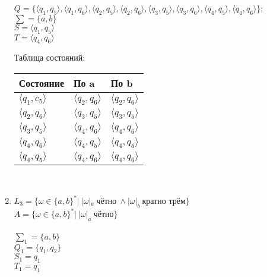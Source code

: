 \documentclass{article}
\begin{document}
\begin{enumerate}
            \hspace*{-20mm}\(Q = \{\langle q_1,q_5\rangle, \langle q_1,q_6\rangle, \langle q_2,q_5\rangle, \langle q_2,q_6\rangle, \langle q_3,q_5\rangle, \langle q_3,q_6\rangle, \langle q_4,q_5\rangle, \langle q_4,q_6\rangle\};\)\\
            \hspace*{-20mm}\(\sum = \{ a,b \}\) \\
            \hspace*{-20mm}\(S = \langle q_1,q_5\rangle\) \\
            \hspace*{-20mm}\(T = \langle q_4,q_6\rangle\) \\

            \centerline{Таблица состояний:}
            
            \begin{tabular}{ | l | l | l | }
            \hline
            Состояние & По a & По b \\ \hline
            \(\langle q_1, c_5\rangle\) & \(\langle q_2, q_6\rangle\) & \(\langle q_2, q_6\rangle\)  \\ \hline
            \(\langle q_2, q_6\rangle\) & \(\langle q_3, q_5\rangle\) & \(\langle q_3, q_5\rangle\) \\ \hline
            \(\langle q_3, q_5\rangle\) & \(\langle q_4, q_6\rangle\) & \(\langle q_4, q_6\rangle\) \\ \hline
            \(\langle q_4, q_6\rangle\) & \(\langle q_4, q_5\rangle\) & \(\langle q_4, q_5\rangle\) \\ \hline
            \(\langle q_4, q_5\rangle\) & \(\langle q_4, q_6\rangle\) & \(\langle q_4, q_6\rangle\) \\
            \hline
            \end{tabular} \\
            
            \begin{center}
            \end{center}
            
            \item \( L_3 = \{ \omega \in \{a,b\}^*| \ |\omega|_a \ \text{чётно} \  \land |\omega|_b \  \text{кратно трём} \}\) \\
        
            \(A = \{ \omega \in \{a,b\}^*| \ |\omega|_a \ \text{чётно} \}\)\\
            \\
            \hspace*{-20mm}\(\sum_1 = \{ a,b \}\) \\
            \hspace*{-20mm}\(Q_1 = \{ q_1, q_2 \}\) \\
            \hspace*{-20mm}\(S_1 = q_1\) \\
            \hspace*{-20mm}\(T_1 = q_1\) \\
            

\end{enumerate}
\end{document}
